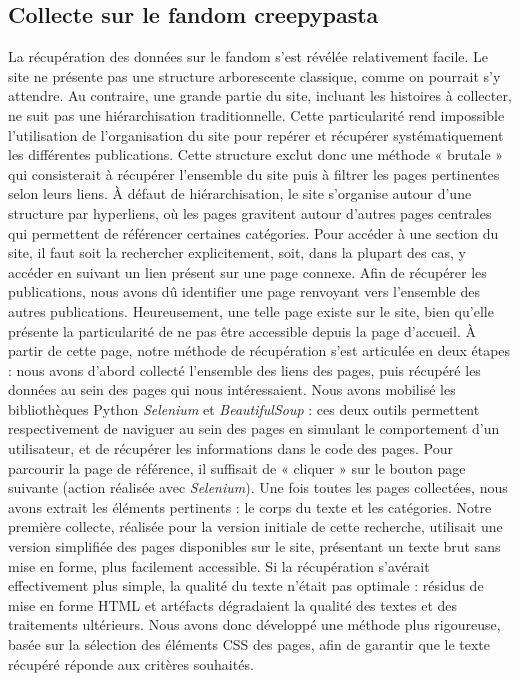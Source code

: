 \documentclass[12pt,a4paper,oneside,titlepage]{book} %
\begin{document}
\subsection{Collecte sur le fandom creepypasta}
La récupération des données sur le fandom s'est révélée relativement facile. Le site ne présente pas une structure arborescente classique, comme on pourrait s'y attendre. Au contraire, une grande partie du site, incluant les histoires à collecter, ne suit pas une hiérarchisation traditionnelle. Cette particularité rend impossible l'utilisation de l'organisation du site pour repérer et récupérer systématiquement les différentes publications.
Cette structure exclut donc une méthode « brutale » qui consisterait à récupérer l'ensemble du site puis à filtrer les pages pertinentes selon leurs liens.
À défaut de hiérarchisation, le site s'organise autour d'une structure par hyperliens, où les pages gravitent autour d'autres pages centrales qui permettent de référencer certaines catégories. Pour accéder à une section du site, il faut soit la rechercher explicitement, soit, dans la plupart des cas, y accéder en suivant un lien présent sur une page connexe.
Afin de récupérer les publications, nous avons dû identifier une page renvoyant vers l'ensemble des autres publications. Heureusement, une telle page existe sur le site, bien qu'elle présente la particularité de ne pas être accessible depuis la page d'accueil.
À partir de cette page, notre méthode de récupération s'est articulée en deux étapes : nous avons d'abord collecté l'ensemble des liens des pages, puis récupéré les données au sein des pages qui nous intéressaient.
Nous avons mobilisé les bibliothèques Python \textit{Selenium} et \textit{BeautifulSoup} : ces deux outils permettent respectivement de naviguer au sein des pages en simulant le comportement d'un utilisateur, et de récupérer les informations dans le code des pages. Pour parcourir la page de référence, il suffisait de « cliquer » sur le bouton page suivante (action réalisée avec \textit{Selenium}). Une fois toutes les pages collectées, nous avons extrait les éléments pertinents : le corps du texte et les catégories.
Notre première collecte, réalisée pour la version initiale de cette recherche, utilisait une version simplifiée des pages disponibles sur le site, présentant un texte brut sans mise en forme, plus facilement accessible. Si la récupération s'avérait effectivement plus simple, la qualité du texte n'était pas optimale : résidus de mise en forme HTML et artéfacts dégradaient la qualité des textes et des traitements ultérieurs.
Nous avons donc développé une méthode plus rigoureuse, basée sur la sélection des éléments CSS des pages, afin de garantir que le texte récupéré réponde aux critères souhaités.
\end{document}
